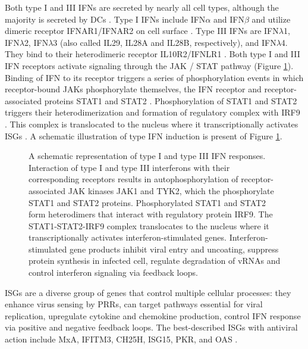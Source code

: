 		Both type I and III \glspl{IFN} are secreted by nearly all cell types, although the majority is secreted by \glspl{DC} \parencite{Siegal1999, Odendall2014}. Type I \glspl{IFN} include \gls{IFN}$\alpha$ and \gls{IFN}$\beta$ and utilize dimeric receptor IFNAR1/IFNAR2 on cell surface \parencite{Mogensen1999}. Type III \glspl{IFN} are \gls{IFN}$\lambda$1, \gls{IFN}$\lambda$2, \gls{IFN}$\lambda$3 (also called \gls{IL}29, \gls{IL}28A and \gls{IL}28B, respectively), and \gls{IFN}$\lambda$4. They bind to their heterodimeric receptor IL10R2/IFNLR1 \parencite{Kotenko2003, Sheppard2003}. Both type I and III \gls{IFN} receptors activate signaling through the \gls{JAK} / \gls{STAT} pathway (Figure \ref{fig:IFN}). Binding of \gls{IFN} to its receptor triggers a series of phosphorylation events in which receptor-bound \glspl{JAK} phosphorylate themselves, the \gls{IFN} receptor and receptor-associated proteins \gls{STAT}1 and \gls{STAT}2 \parencite{VanBoxel-Dezaire2006}. Phosphorylation of \gls{STAT}1 and \gls{STAT}2 triggers their heterodimerization and formation of regulatory complex with \gls{IRF}9 \parencite{Fu1990}. This complex is translocated to the nucleus where it transcriptionally activates \glspl{ISG} \parencite{Levy1988}. A schematic illustration of type \gls{IFN} induction is present of Figure \ref{fig:IFN}.

		\begin{figure}[h!]
			\centering
			\caption{A schematic representation of type I and type III \gls{IFN} responses. Interaction of type I and type III interferons with their corresponding receptors  results in autophosphorylation of receptor-associated JAK kinases JAK1 and TYK2, which the phosphorylate STAT1 and STAT2 proteins. Phosphorylated STAT1 and STAT2 form heterodimers that interact with regulatory protein IRF9. The STAT1-STAT2-IRF9 complex translocates to the nucleus where it transcriptionally activates interferon-stimulated genes. Interferon-stimulated gene products inhibit viral entry and uncoating, suppress protein synthesis in infected cell, regulate degradation of vRNAs and control interferon signaling via feedback loops.} \label{fig:IFN}
		\end{figure}
				
		\glspl{ISG} are a diverse group of genes that control multiple cellular processes: they enhance virus sensing by \gls{PRR}s, can target pathways essential for viral replication, upregulate cytokine and chemokine production, control \gls{IFN} response via positive and negative feedback loops. The best-described \gls{ISG}s with antiviral action include \gls{MxA}, \gls{IFITM3}, \gls{CH25H}, \gls{ISG15}, \gls{PKR}, and \gls{OAS} \parencite{Sadler2008}. 
		
